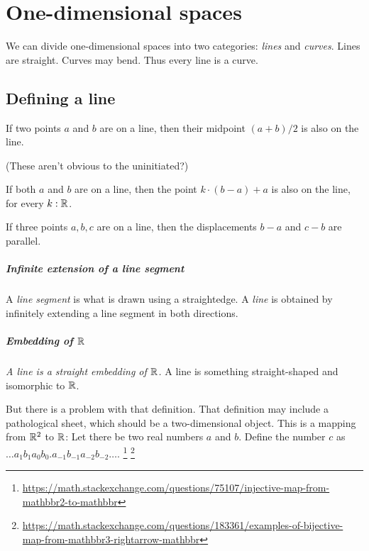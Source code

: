 \chapter{One-dimensional spaces}

We can divide one-dimensional spaces into two categories:
\emph{lines} and \emph{curves}.
Lines are straight.
Curves may bend.
Thus every line is a curve.



\section{Defining a line}

If two points \(a\) and \(b\) are on a line,
then their midpoint \((a + b) / 2\) is also on the line.

(These aren't obvious to the uninitiated?)

If both \(a\) and \(b\) are on a line,
then the point \(k \cdot (b - a) + a\) is also on the line, for every \(k:\mathbb{R}\).

If three points \(a,b,c\) are on a line,
then the displacements \(b-a\) and \(c-b\) are parallel.

\paragraph{Infinite extension of a line segment}
A \emph{line segment} is what is drawn using a straightedge.
A \emph{line} is obtained by infinitely extending a line segment in both directions.

\paragraph{Embedding of \(\mathbb{R}\)}
\emph{A line is a straight embedding of \(\mathbb{R}\).}
A line is something straight-shaped and isomorphic to \(\mathbb{R}\).

But there is a problem with that definition.
That definition may include a pathological sheet, which should be a two-dimensional object.
This is a mapping from \(\mathbb{R}^2\) to \(\mathbb{R}\):
Let there be two real numbers \(a\) and \(b\).
Define the number \(c\) as \(\ldots a_1 b_1 a_0 b_0 . a_{-1} b_{-1} a_{-2} b_{-2} \ldots\).%
\footnote{\url{https://math.stackexchange.com/questions/75107/injective-map-from-mathbbr2-to-mathbbr}}%
\footnote{\url{https://math.stackexchange.com/questions/183361/examples-of-bijective-map-from-mathbbr3-rightarrow-mathbbr}}

